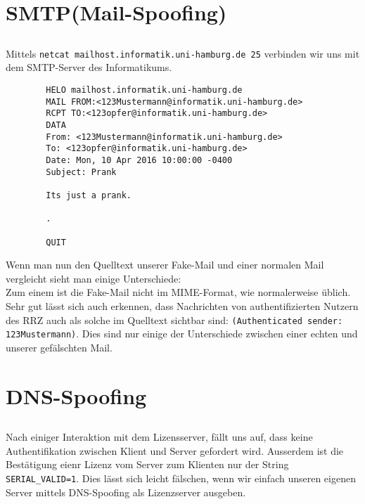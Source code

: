 \documentclass{scrartcl}
\begin{document}
  \section{SMTP(Mail-Spoofing)}
  \label{sec:SMTP(Mail-Spoofing)}
    \subsection{}
    \label{sub:2.1}
      Mittels \texttt{netcat mailhost.informatik.uni-hamburg.de 25} verbinden
      wir uns mit dem SMTP-Server des Informatikums.
      \begin{lstlisting}
        HELO mailhost.informatik.uni-hamburg.de
        MAIL FROM:<123Mustermann@informatik.uni-hamburg.de>
        RCPT TO:<123opfer@informatik.uni-hamburg.de>
        DATA
        From: <123Mustermann@informatik.uni-hamburg.de>
        To: <123opfer@informatik.uni-hamburg.de>
        Date: Mon, 10 Apr 2016 10:00:00 -0400
        Subject: Prank

        Its just a prank.

        .

        QUIT
      \end{lstlisting}
      Wenn man nun den Quelltext unserer Fake-Mail und einer normalen Mail
      vergleicht sieht man einige Unterschiede:\\
      Zum einem ist die Fake-Mail nicht im MIME-Format, wie normalerweise
      üblich. Sehr gut lässt sich auch erkennen, dass Nachrichten von
      authentifizierten Nutzern des RRZ auch als solche im Quelltext sichtbar
      sind: \texttt{(Authenticated sender: 123Mustermann)}. Dies sind nur
      einige der Unterschiede zwischen einer echten und unserer gefälschten
      Mail.

  \section{DNS-Spoofing}
  \label{sec:DNS-Spoofing}
    \subsection{}
    \label{sub:3.1}
      Nach einiger Interaktion mit dem Lizensserver, fällt uns auf, dass keine
      Authentifikation zwischen Klient und Server gefordert wird. Ausserdem ist
      die Bestätigung eienr Lizenz vom Server zum Klienten nur der String
      \texttt{SERIAL\_VALID=1}. Dies lässt sich leicht fälschen, wenn wir
      einfach unseren eigenen Server mittels DNS-Spoofing als Lizenzserver
      ausgeben.
\end{document}
